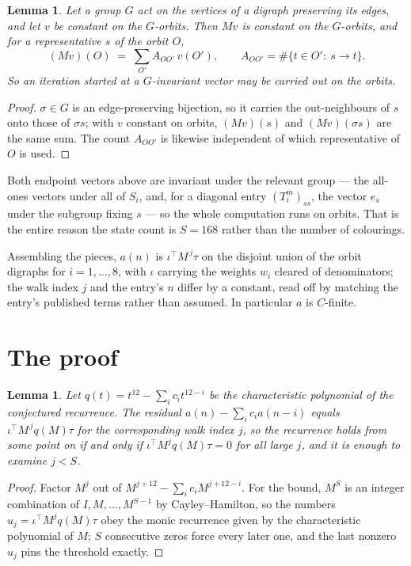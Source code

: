 \documentclass[11pt,a4paper]{article}
\theoremstyle{plain}
\newtheorem{lemma}[theorem]{Lemma}
\theoremstyle{definition}
\begin{document}
\begin{lemma}\label{lem:lump}
Let a group $G$ act on the vertices of a digraph preserving its edges, and let $v$ be constant
on the $G$-orbits. Then $Mv$ is constant on the $G$-orbits, and for a representative $s$ of
the orbit $O$,
\[
(Mv)(O)\;=\;\sum_{O'}A_{OO'}\,v(O'),\qquad
A_{OO'}=\#\{t\in O':\ s\to t\} .
\]
So an iteration started at a $G$-invariant vector may be carried out on the orbits.
\end{lemma}

\begin{proof}
$\sigma\in G$ is an edge-preserving bijection, so it carries the out-neighbours of $s$ onto
those of $\sigma s$; with $v$ constant on orbits, $(Mv)(s)$ and $(Mv)(\sigma s)$ are the same
sum. The count $A_{OO'}$ is likewise independent of which representative of $O$ is used.
\end{proof}

Both endpoint vectors above are invariant under the relevant group --- the all-ones vectors
under all of $S_i$, and, for a diagonal entry $(T_i^m)_{ss}$, the vector $e_s$ under the
subgroup fixing $s$ --- so the whole computation runs on orbits. That is the entire reason the
state count is $S=168$ rather than the number of colourings.

Assembling the pieces, $a(n)$ is $\iota^{\!\top}M^{\,j}\tau$ on the disjoint union of the
orbit digraphs for $i=1,\dots,8$, with $\iota$ carrying the weights $w_i$ cleared of
denominators; the walk index $j$ and the entry's $n$ differ by a constant, read off by
matching the entry's published terms rather than assumed. In particular $a$ is $C$-finite.

\section{The proof}

\begin{lemma}\label{lem:crit}
Let $q(t)=t^{12}-\sum_i c_it^{12-i}$ be the characteristic polynomial of the
conjectured recurrence. The residual $a(n)-\sum_ic_ia(n-i)$ equals
$\iota^{\!\top}M^{\,j}q(M)\tau$ for the corresponding walk index $j$, so the recurrence
holds from some point on if and only if $\iota^{\!\top}M^{j}q(M)\tau=0$ for all large $j$,
and it is enough to examine $j<S$.
\end{lemma}

\begin{proof}
Factor $M^{j}$ out of $M^{j+12}-\sum_ic_iM^{j+12-i}$. For the bound, $M^{S}$
is an integer combination of $I,M,\dots,M^{S-1}$ by Cayley--Hamilton, so the numbers
$u_j=\iota^{\!\top}M^{j}q(M)\tau$ obey the monic recurrence given by the characteristic
polynomial of $M$; $S$ consecutive zeros force every later one, and the last nonzero $u_j$
pins the threshold exactly.
\end{proof}
\end{document}
